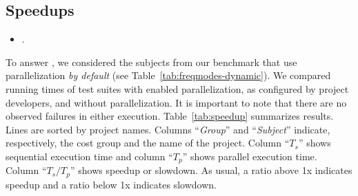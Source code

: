 \begin{center}
\vspace{1ex}
\vspace{1ex}
\end{center}

\subsection{Speedups}
\label{sec:rqD}

\begin{itemize}
    \item \numRQSpeedupOne{}. \textbf{\RQSpeedupOne}
\end{itemize}


To answer \numRQSpeedupOne{}, we considered the \numProjectsPar{}
subjects from our benchmark that use parallelization \emph{by default}
(see Table~\ref{tab:freqmodes-dynamic}).  We compared running times
of test suites with enabled parallelization, as configured by project
developers, and without parallelization. It is important to note that
there are no observed failures in either execution.
Table~\ref{tab:speedup} summarizes results.
Lines are sorted by project names.
Columns ``\emph{Group}'' and ``\emph{Subject}'' indicate, respectively,
the cost group and the name of the project.
Column ``$T_s$'' shows sequential execution time and column ``$T_p$''
shows parallel execution time.
Column ``$T_s/T_p$'' shows speedup or slowdown.
As usual, a ratio above 1x indicates speedup and a ratio below 1x
indicates slowdown.

